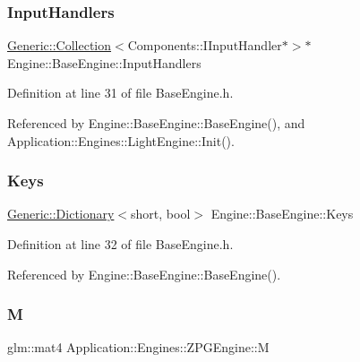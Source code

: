 \subsubsection{\texorpdfstring{Input\+Handlers}{InputHandlers}}
{\footnotesize\ttfamily \mbox{\hyperlink{classGeneric_1_1Collection}{Generic\+::\+Collection}}$<$Components\+::\+I\+Input\+Handler$\ast$$>$$\ast$ Engine\+::\+Base\+Engine\+::\+Input\+Handlers\hspace{0.3cm}{\ttfamily [inherited]}}



Definition at line 31 of file Base\+Engine.\+h.



Referenced by Engine\+::\+Base\+Engine\+::\+Base\+Engine(), and Application\+::\+Engines\+::\+Light\+Engine\+::\+Init().

\mbox{\label{classEngine_1_1BaseEngine_a65321a97e83f0a6ee90df3efac2d3307}} 
\subsubsection{\texorpdfstring{Keys}{Keys}}
{\footnotesize\ttfamily \mbox{\hyperlink{classGeneric_1_1Dictionary}{Generic\+::\+Dictionary}}$<$short, bool$>$ Engine\+::\+Base\+Engine\+::\+Keys\hspace{0.3cm}{\ttfamily [inherited]}}



Definition at line 32 of file Base\+Engine.\+h.



Referenced by Engine\+::\+Base\+Engine\+::\+Base\+Engine().

\mbox{\label{classApplication_1_1Engines_1_1ZPGEngine_a6e982d6b97e8d538cdf8df9a7f4c6cd0}} 
\subsubsection{\texorpdfstring{M}{M}}
{\footnotesize\ttfamily glm\+::mat4 Application\+::\+Engines\+::\+Z\+P\+G\+Engine\+::M\hspace{0.3cm}{\ttfamily [private]}}



